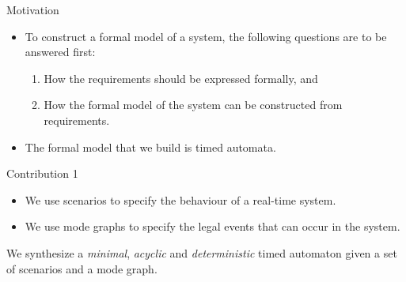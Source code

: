 \documentclass[10pt]{beamer}
\theoremstyle{plain}
\theoremstyle{definition}
\begin{document}
\begin{frame}{Motivation}
	\begin{itemize}
		\item	{To construct a formal model of a system, the following questions are to be answered first:
					\begin{enumerate}
						\item How the requirements should be expressed formally, and
						\item How the formal model of the system can be constructed from requirements.
					\end{enumerate}
				}
		\item {The formal model that we build is \alert{timed automata}.}
\end{itemize}
\end{frame}

\begin{frame}{Contribution 1}
	\begin{itemize}
		\item We use scenarios to specify the behaviour of a real-time system. %
		\item We use mode graphs to specify the legal events that can occur in the system.
	\end{itemize}
	\alert{We synthesize a \emph{minimal}, \emph{acyclic} and \emph{deterministic} timed automaton given a set of scenarios and a mode graph.}
\end{frame}

\end{document}
